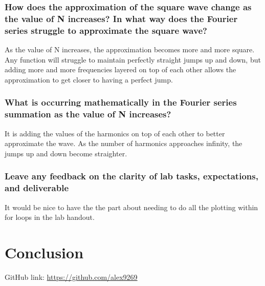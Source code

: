 \documentclass[12pt]{report}
\begin{document}
 \subsubsection{How does the approximation of the square wave change as the value of N increases? In what way does the Fourier series struggle to approximate the square wave?}
 
As the value of N increases, the approximation becomes more and more square. Any function will struggle to maintain perfectly straight jumps up and down, but adding more and more frequencies layered on top of each other allows the approximation to get closer to having a perfect jump.
 
 \subsubsection{What is occurring mathematically in the Fourier series summation as the value of N increases?}
 
 It is adding the values of the harmonics on top of each other to better approximate the wave. As the number of harmonics approaches infinity, the jumps up and down become straighter.
 
 \subsubsection{Leave any feedback on the clarity of lab tasks, expectations, and deliverable}
 
It would be nice to have the the part about needing to do all the plotting within for loops in the lab handout.
 
 \section{Conclusion}
 

 
 GitHub link: \url{https://github.com/alex9269}
 
\end{document}

